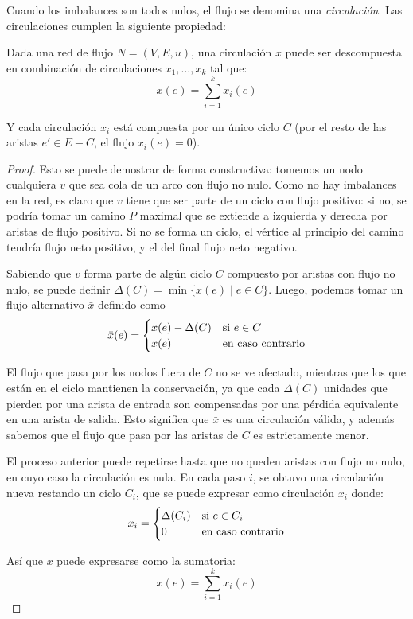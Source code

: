 Cuando los imbalances son todos nulos, el flujo se denomina una \textit{circulación}. Las circulaciones cumplen la siguiente propiedad:

\begin{theorem*}
    Dada una red de flujo $N = (V, E, u)$, una circulación $x$ puede ser descompuesta en combinación de circulaciones $x_1, ..., x_k$ tal que:
    $$x(e) = \sum_{i = 1}^k x_i(e)$$

    Y cada circulación $x_i$ está compuesta por un único ciclo $C$ (por el resto de las aristas $e' \in E - C$, el flujo $x_i(e) = 0$).
\end{theorem*}
\begin{proof}
    Esto se puede demostrar de forma constructiva: tomemos un nodo cualquiera $v$ que sea cola de un arco con flujo no nulo. Como no hay imbalances en la red, es claro que $v$ tiene que ser parte de un ciclo con flujo positivo: si no, se podría tomar un camino $P$ maximal que se extiende a izquierda y derecha por aristas de flujo positivo. Si no se forma un ciclo, el vértice al principio del camino tendría flujo neto positivo, y el del final flujo neto negativo.

    Sabiendo que $v$ forma parte de algún ciclo $C$ compuesto por aristas con flujo no nulo, se puede definir $\Delta(C) = \min{\{x(e) \mid e \in C\}}$. Luego, podemos tomar un flujo alternativo $\bar{x}$ definido como
    $$
        \bar{x}(e) =
        \begin{cases}
            x(e) - \Delta(C) & \text{si } e \in C \\
            x(e)             & \text{en caso contrario}
        \end{cases}
    $$

    El flujo que pasa por los nodos fuera de $C$ no se ve afectado, mientras que los que están en el ciclo mantienen la conservación, ya que cada $\Delta(C)$ unidades que pierden por una arista de entrada son compensadas por una pérdida equivalente en una arista de salida. Esto significa que $\bar{x}$ es una circulación válida, y además sabemos que el flujo que pasa por las aristas de $C$ es estrictamente menor.

    El proceso anterior puede repetirse hasta que no queden aristas con flujo no nulo, en cuyo caso la circulación es nula. En cada paso $i$, se obtuvo una circulación nueva restando un ciclo $C_i$, que se puede expresar como circulación $x_i$ donde:
    $$
        x_i =
        \begin{cases}
            \Delta(C_i) & \text{si } e \in C_i \\
            0           & \text{en caso contrario}
        \end{cases}
    $$

    Así que $x$ puede expresarse como la sumatoria:
    $$x(e) = \sum_{i = 1}^k x_i(e)$$

\end{proof}

